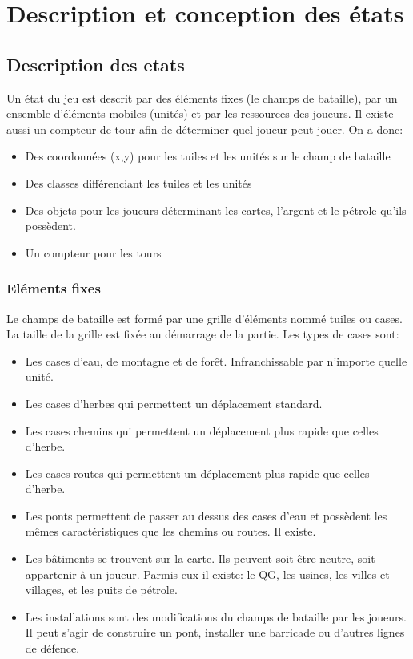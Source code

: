 \section{Description et conception des états}

\subsection{Description des etats}

Un état du jeu est descrit par des éléments fixes (le champs de bataille), par un ensemble d'éléments mobiles (unités) et par les ressources des joueurs. Il existe aussi un compteur de tour afin de déterminer quel joueur peut jouer. On a donc:

\begin{itemize}
    \item Des coordonnées (x,y) pour les tuiles et les unités sur le champ de bataille
    \item Des classes différenciant les tuiles et les unités
    \item Des objets pour les joueurs déterminant les cartes, l'argent et le pétrole qu'ils possèdent.
    \item Un compteur pour les tours
\end{itemize}


\subsubsection{Eléments fixes}

Le champs de bataille est formé par une grille d'éléments nommé tuiles ou cases. La taille de la grille est fixée au démarrage de la partie. Les types de cases sont:

\begin{itemize}
    \item Les cases d'eau, de montagne et de forêt. Infranchissable par n'importe quelle unité.
    \item Les cases d'herbes qui permettent un déplacement standard.
    \item Les cases chemins qui permettent un déplacement plus rapide que celles d'herbe.
    \item Les cases routes qui permettent un déplacement plus rapide que celles d'herbe.
    \item Les ponts permettent de passer au dessus des cases d'eau et possèdent les mêmes caractéristiques que les chemins ou routes. Il existe.
    \item Les bâtiments se trouvent sur la carte. Ils peuvent soit être neutre, soit appartenir à un joueur. Parmis eux il existe: le QG, les usines, les villes et villages, et les puits de pétrole.
    \item Les installations sont des modifications du champs de bataille par les joueurs. Il peut s'agir de construire un pont, installer une barricade ou d'autres lignes de défence.
\end{itemize}

